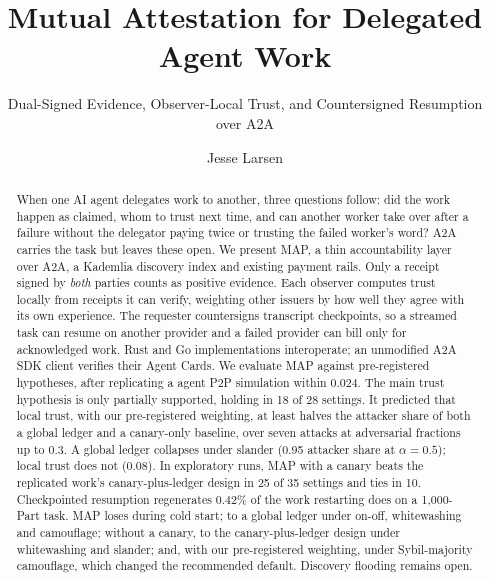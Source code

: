 \documentclass[sigconf,nonacm]{acmart}
\newcommand{\sys}{MAP}
\begin{document}
\title{Mutual Attestation for Delegated Agent Work}
\subtitle{Dual-Signed Evidence, Observer-Local Trust, and Countersigned Resumption over A2A}

\author{Jesse Larsen}

\begin{abstract}
When one AI agent delegates work to another, three questions follow: did
the work happen as claimed, whom to trust next time, and can another
worker take over after a failure without the delegator paying twice or
trusting the failed worker's word? A2A carries the task but leaves these open. We present \sys{}, a thin accountability layer over A2A,
a Kademlia discovery index and existing payment rails. Only a receipt
signed by \emph{both} parties counts as positive evidence. Each observer
computes trust locally from receipts it can verify, weighting other
issuers by how well they agree with its own experience. The requester
countersigns transcript checkpoints, so a streamed task can resume on another
provider and a failed provider can bill only for acknowledged work. Rust
and Go implementations interoperate; an unmodified A2A SDK client verifies their Agent Cards.
We evaluate \sys{} against pre-registered hypotheses, after replicating a
agent P2P simulation within 0.024. The main trust hypothesis is
only partially supported, holding in 18 of 28 settings. It predicted that
local trust, with our pre-registered weighting, at least halves the
attacker share of both a global ledger and a canary-only baseline, over
seven attacks at adversarial fractions up to 0.3.
A global ledger collapses under slander (0.95 attacker share at
$\alpha{=}0.5$); local trust does not (0.08). In exploratory runs, \sys{}
with a canary beats the replicated work's
canary-plus-ledger design in 25 of 35 settings and ties in 10.
Checkpointed resumption regenerates 0.42\% of the work restarting does on a
1,000-Part task.
\sys{} loses during cold start; to a global ledger under on-off,
whitewashing and camouflage; without a canary, to the canary-plus-ledger
design under whitewashing and slander; and, with our pre-registered
weighting, under Sybil-majority camouflage, which changed the recommended
default. Discovery flooding remains open.
\end{abstract}

\end{document}
